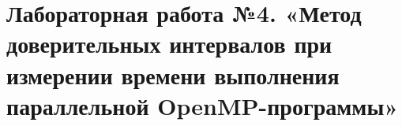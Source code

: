 { %
	\section{Лабораторная работа №4. «Метод доверительных интервалов при измерении времени выполнения
параллельной OpenMP-программы»}
	
	
	
}
